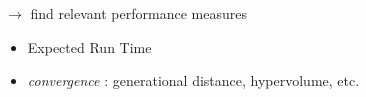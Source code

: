 $\rightarrow$ find relevant performance measures

\begin{itemize}
\item Expected Run Time
\item \textit{convergence} : generational distance, hypervolume, etc.
\end{itemize}
















